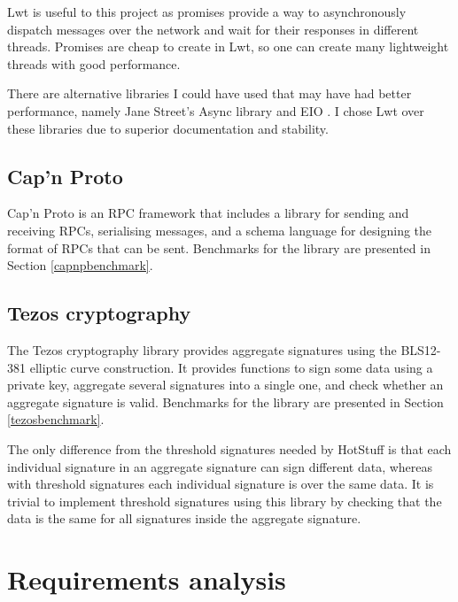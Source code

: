 Lwt is useful to this project as promises provide a way to asynchronously dispatch messages over the network and wait for their responses in different threads. Promises are cheap to create in Lwt, so one can create many lightweight threads with good performance.

There are alternative libraries I could have used that may have had better performance, namely Jane Street's Async library \cite{async} and EIO \cite{eio}. I chose Lwt over these libraries due to superior documentation and stability.

\subsection{Cap'n Proto}
Cap'n Proto \cite{capnp} is an RPC framework that includes a library for sending and receiving RPCs, serialising messages, and a schema language for designing the format of RPCs that can be sent. Benchmarks for the library are presented in Section \ref{capnpbenchmark}.

\subsection{Tezos cryptography} \label{tezos}
The Tezos cryptography library \cite{tezosCrypto} provides aggregate signatures using the BLS12-381 elliptic curve construction. It provides functions to sign some data using a private key, aggregate several signatures into a single one, and check whether an aggregate signature is valid. Benchmarks for the library are presented in Section \ref{tezosbenchmark}.

The only difference from the threshold signatures needed by HotStuff is that each individual signature in an aggregate signature can sign different data, whereas with threshold signatures each individual signature is over the same data. It is trivial to implement threshold signatures using this library by checking that the data is the same for all signatures inside the aggregate signature.

\section{Requirements analysis} \label{requirements}


